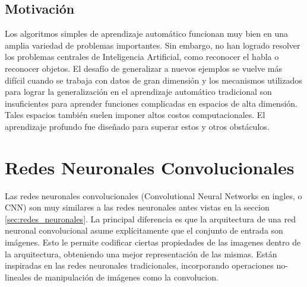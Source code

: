 \documentclass[a4paper,11pt,spanish]{book}
\begin{document}
    \subsection {Motivación}
      Los algoritmos simples de aprendizaje automático funcionan muy bien en una amplia variedad de problemas importantes.
      Sin embargo, no han logrado resolver los problemas centrales de Inteligencia Artificial, como reconocer el habla o reconocer objetos.
      El desafío de generalizar a nuevos ejemplos se vuelve más difícil cuando se trabaja con datos de gran dimensión y los mecanismos utilizados para lograr la generalización
      en el aprendizaje  automático tradicional son insuficientes para aprender funciones complicadas en espacios de alta dimensión.
      Tales espacios también suelen imponer altos costos computacionales. El aprendizaje profundo fue diseñado para superar estos y otros obstáculos.
\fi
  \section {Redes Neuronales Convolucionales} \label{sec:redes_convolucionales}
      Las redes neuronales convolucionales (Convolutional Neural Networks en ingles, o CNN) son muy similares a las redes neuronales antes vistas en la seccion \ref{sec:redes_neuronales}.
      La principal diferencia es que la arquitectura de una red neuronal convolucional asume explícitamente que el conjunto de entrada son imágenes. 
      Esto le permite codificar ciertas propiedades de las imagenes dentro de la arquitectura, obteniendo una mejor representación de las mismas.
      Están inspiradas en las redes neuronales tradicionales, incorporando operaciones no-lineales de manipulación de imágenes como la convolucion.
      
\end{document}
